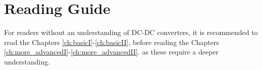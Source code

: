 \section*{Reading Guide}
For readers without an understanding of DC-DC converters,
it is recommended to read the Chapters \ref{ch:basicI}-\ref{ch:basicII}, 
before reading the Chapters \ref{ch:more_advancedI}-\ref{ch:more_advancedII}. 
as these require a deeper understanding.